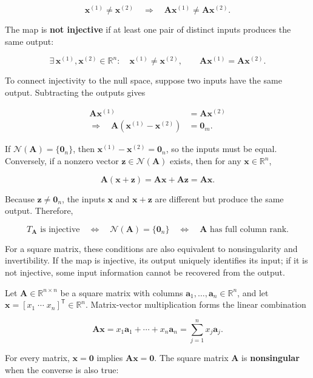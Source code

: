\documentclass[
  australian,
  12pt,
  letterpaper,
  DIV=11,
  numbers=noendperiod,
  twoside]{scrreprt}
\begin{document}
\[
\mathbf x^{(1)}\neq\mathbf x^{(2)}
\quad\Longrightarrow\quad
\mathbf A\mathbf x^{(1)}\neq\mathbf A\mathbf x^{(2)}.
\]

The map is \textbf{not injective} if at least one pair of distinct
inputs produces the same output:

\[
\exists\,\mathbf x^{(1)},\mathbf x^{(2)}\in\mathbb R^n:
\quad
\mathbf x^{(1)}\neq\mathbf x^{(2)},
\qquad
\mathbf A\mathbf x^{(1)}=\mathbf A\mathbf x^{(2)}.
\]

To connect injectivity to the null space, suppose two inputs have the
same output. Subtracting the outputs gives

\[
\begin{aligned}
\mathbf A\mathbf x^{(1)}&=\mathbf A\mathbf x^{(2)}\\
\Longrightarrow\quad
\mathbf A(\mathbf x^{(1)}-\mathbf x^{(2)})&=\mathbf0_m.
\end{aligned}
\]

If \(\mathcal N(\mathbf A)=\{\mathbf0_n\}\), then
\(\mathbf x^{(1)}-\mathbf x^{(2)}=\mathbf0_n\), so the inputs must be
equal. Conversely, if a nonzero vector
\(\mathbf z\in\mathcal N(\mathbf A)\) exists, then for any
\(\mathbf x\in\mathbb R^n\),

\[
\mathbf A(\mathbf x+\mathbf z)
=\mathbf A\mathbf x+\mathbf A\mathbf z
=\mathbf A\mathbf x.
\]

Because \(\mathbf z\neq\mathbf0_n\), the inputs \(\mathbf x\) and
\(\mathbf x+\mathbf z\) are different but produce the same output.
Therefore,

\[
\boxed{
T_{\mathbf A}\text{ is injective}
\quad\Longleftrightarrow\quad
\mathcal N(\mathbf A)=\{\mathbf0_n\}
\quad\Longleftrightarrow\quad
\mathbf A\text{ has full column rank}
}.
\]

For a square matrix, these conditions are also equivalent to
nonsingularity and invertibility. If the map is injective, its output
uniquely identifies its input; if it is not injective, some input
information cannot be recovered from the output.

Let \(\mathbf A\in\mathbb R^{n\times n}\) be a square matrix with
columns \(\mathbf a_1,\ldots,\mathbf a_n\in\mathbb R^n\), and let
\(\mathbf x=[x_1\;\cdots\;x_n]^\mathsf T\in\mathbb R^n\). Matrix-vector
multiplication forms the linear combination

\[
\mathbf A\mathbf x
=
x_1\mathbf a_1+\cdots+x_n\mathbf a_n
=
\sum_{j=1}^{n}x_j\mathbf a_j.
\]

For every matrix, \(\mathbf x=\mathbf 0\) implies
\(\mathbf A\mathbf x=\mathbf 0\). The square matrix \(\mathbf A\) is
\textbf{nonsingular} when the converse is also true:
\end{document}
